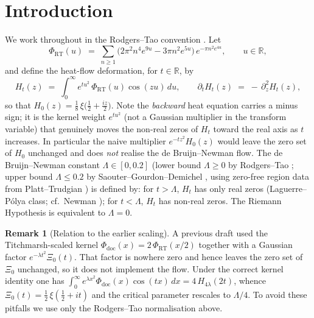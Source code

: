 \documentclass[12pt,a4paper]{amsart}
\theoremstyle{plain}
\theoremstyle{definition}
\newtheorem{remark}[theorem]{Remark}
\newcommand{\R}{\mathbb{R}}
\begin{document}
\section{Introduction}
\label{sec:intro}

We work throughout in the Rodgers--Tao convention \cite{RodgersTao2020}.
Let
\[
  \Phi_{\mathrm{RT}}(u) \;=\; \sum_{n\ge 1}
    \bigl(2\pi^2 n^4 e^{9u} - 3\pi n^2 e^{5u}\bigr)\,e^{-\pi n^2 e^{4u}},
    \qquad u \in \R,
\]
and define the heat-flow deformation, for $t \in \R$, by
\begin{equation}\label{eq:heatflow}
  H_t(z) \;=\; \int_0^\infty e^{t u^2}\,\Phi_{\mathrm{RT}}(u)\cos(zu)\,du,
  \qquad
  \partial_t H_t(z) \;=\; -\,\partial_z^2 H_t(z),
\end{equation}
so that $H_0(z) = \tfrac18\,\xi\!\bigl(\tfrac12 + \tfrac{iz}{2}\bigr)$.
Note the \emph{backward} heat equation carries a minus sign; it is the
kernel weight $e^{tu^2}$ (not a Gaussian multiplier in the transform
variable) that genuinely moves the non-real zeros of $H_t$ toward the
real axis as $t$ increases.  In particular the naive multiplier
$e^{-t z^2} H_0(z)$ would leave the zero set of $H_0$ unchanged and does
\emph{not} realise the de Bruijn--Newman flow.
The de Bruijn--Newman constant $\Lambda \in [0, 0.2]$ (lower bound
$\Lambda \ge 0$ by Rodgers--Tao \cite{RodgersTao2020}; upper bound
$\Lambda \le 0.2$ by Saouter--Gourdon--Demichel \cite{SaouterGourdon2011},
using zero-free region data from Platt--Trudgian \cite{PlattTrudgian2021})
is defined by:
for $t > \Lambda$, $H_t$ has only real zeros
(Laguerre--P\'olya class; cf.\ Newman \cite{Newman1976}); for
$t < \Lambda$, $H_t$ has non-real zeros.
The Riemann Hypothesis is equivalent to $\Lambda = 0$.

\begin{remark}[Relation to the earlier scaling]
  A previous draft used the Titchmarsh-scaled kernel
  $\Phi_{\mathrm{doc}}(x) = 2\,\Phi_{\mathrm{RT}}(x/2)$ together with a
  Gaussian factor $e^{-\lambda t^2}\Xi_0(t)$.  That factor is nowhere
  zero and hence leaves the zero set of $\Xi_0$ unchanged, so it does not
  implement the flow.  Under the correct kernel identity one has
  $\int_0^\infty e^{\lambda x^2}\Phi_{\mathrm{doc}}(x)\cos(tx)\,dx
   = 4\,H_{4\lambda}(2t)$, whence $\Xi_0(t) = \tfrac12\,\xi(\tfrac12+it)$
  and the critical parameter rescales to $\Lambda/4$.  To avoid these
  pitfalls we use only the Rodgers--Tao normalisation above.
\end{remark}
\end{document}
